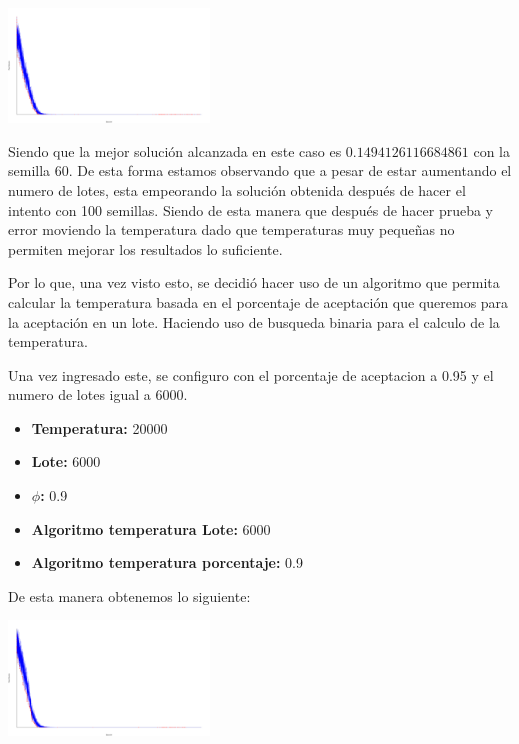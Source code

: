 \begin{multicols}{2}
\begin{center}
    \includegraphics[width=0.4\textwidth]{../svgs/150_documentable_semilla_60.pdf}
\end{center}

Siendo que la mejor solución alcanzada en este caso es $0.1494126116684861$ con la semilla 60. De esta forma estamos observando que a pesar de estar aumentando el numero de lotes, esta empeorando la solución obtenida después de hacer el intento con 100 semillas. Siendo de esta manera que después de hacer prueba y error moviendo la temperatura dado que temperaturas muy pequeñas no permiten mejorar los resultados lo suficiente. 

Por lo que, una vez visto esto, se decidió hacer uso de un algoritmo que permita calcular la temperatura basada en el porcentaje de aceptación que queremos para la aceptación en un lote. Haciendo uso de busqueda binaria para el calculo de la temperatura.

Una vez ingresado este, se configuro con el porcentaje de aceptacion a 0.95 y el numero de lotes igual a 6000.

\begin{itemize}
\item \textbf{Temperatura:} 20000
\item \textbf{Lote: } 6000
\item \textbf{$\phi$: } 0.9
\item \textbf{Algoritmo temperatura Lote: } 6000
\item \textbf{Algoritmo temperatura porcentaje: } 0.9
\end{itemize}

De esta manera obtenemos lo siguiente:

\begin{center}
    \includegraphics[width=0.4\textwidth]{../svgs/150_documentable_semilla_99.pdf}
\end{center}


\end{multicols}
